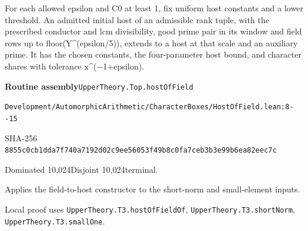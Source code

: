 
\begin{formalstatement}[D511]\label{decomp:D511}
For each allowed epsilon and C0 at least 1, fix uniform host constants and a lower threshold. An admitted initial host of an admissible rank tuple, with the prescribed conductor and lcm divisibility, good prime pair in its window and field rows up to floor(Y\textasciicircum{}(epsilon/5)), extends to a host at that scale and an auxiliary prime. It has the chosen constants, the four-parameter host bound, and character shares with tolerance x\textasciicircum{}(\ensuremath{-}1+epsilon).
\end{formalstatement}
{\small\raggedright\noindent\textsf{\bfseries Routine assembly}\quad \nolinkurl{UpperTheory.Top.hostOfField}\par\noindent \nolinkurl{Development/AutomorphicArithmetic/CharacterBoxes/HostOfField.lean:8--15}\par\noindent SHA-256 \nolinkurl{8855c0cb1dda7f740a7192d02c9ee56053f49b8c0fa7ceb3b3e99b6ea82eec7c}\par\noindent Dominated 10,024\quad Disjoint 10,024\quad terminal.\par}
Applies the field-to-host constructor to the short-norm and small-element inputs.
{\small\raggedright Local proof uses \nolinkurl{UpperTheory.T3.hostOfFieldOf}, \nolinkurl{UpperTheory.T3.shortNorm}, \nolinkurl{UpperTheory.T3.smallOne}.\par}

